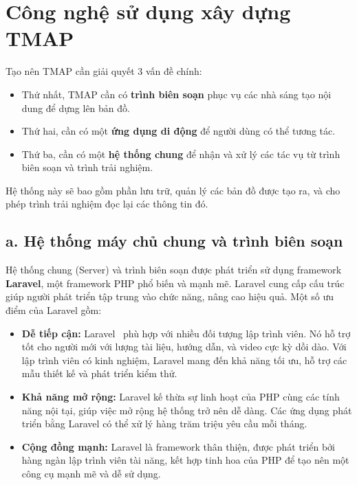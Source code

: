\section{Công nghệ sử dụng xây dựng TMAP}

Tạo nên TMAP cần giải quyết 3 vấn đề chính:
\begin{itemize}
    \item Thứ nhất, TMAP cần có \textbf{trình biên soạn} phục vụ các nhà sáng tạo nội dung để dựng lên bản đồ.
    \item Thứ hai, cần có một \textbf{ứng dụng di động} để người dùng có thể tương tác.
    \item Thứ ba, cần có một \textbf{hệ thống chung} để nhận và xử lý các tác vụ từ trình biên soạn và trình trải nghiệm.
\end{itemize}

Hệ thống này sẽ bao gồm phần lưu trữ, quản lý các bản đồ được tạo ra, và cho phép trình trải nghiệm đọc lại các thông tin đó.

\subsection*{a. Hệ thống máy chủ chung và trình biên soạn}

Hệ thống chung (Server) và trình biên soạn được phát triển sử dụng framework \textbf{Laravel}, một framework PHP phổ biến và mạnh mẽ. Laravel cung cấp cấu trúc giúp người phát triển tập trung vào chức năng, nâng cao hiệu quả. Một số ưu điểm của Laravel gồm:

\begin{itemize}
    \item \textbf{Dễ tiếp cận:} Laravel~\cite{laravel2022} phù hợp với nhiều đối tượng lập trình viên. Nó hỗ trợ tốt cho người mới với lượng tài liệu, hướng dẫn, và video cực kỳ dồi dào. Với lập trình viên có kinh nghiệm, Laravel mang đến khả năng tối ưu, hỗ trợ các mẫu thiết kế và phát triển kiểm thử.
    \item \textbf{Khả năng mở rộng:} Laravel kế thừa sự linh hoạt của PHP cùng các tính năng nội tại, giúp việc mở rộng hệ thống trở nên dễ dàng. Các ứng dụng phát triển bằng Laravel có thể xử lý hàng trăm triệu yêu cầu mỗi tháng.
    \item \textbf{Cộng đồng mạnh:} Laravel là framework thân thiện, được phát triển bởi hàng ngàn lập trình viên tài năng, kết hợp tinh hoa của PHP để tạo nên một công cụ mạnh mẽ và dễ sử dụng.
\end{itemize}

